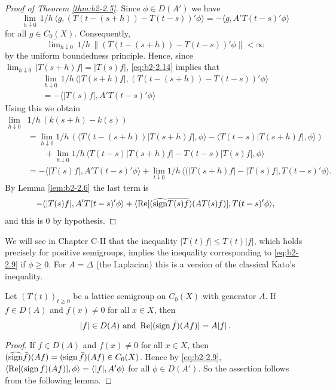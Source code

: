 \begin{proof}[Proof of Theorem \ref{thm:b2-2.5}]
Since $\phi \in D(A')$ we have
\begin{equation}\label{eq:b2-2.14}
\lim_{h \downarrow 0}\, 1/h\, \langle g,(T(t-(s+h)) - T(t-s))'\phi \rangle = - \langle g,A'T(t-s)'\phi \rangle
\end{equation}
for all $g \in C_{0}(X)$.
Consequently,
\begin{equation*}
\overline{\lim}_{h \downarrow 0}\, 1/h\, \|(T(t-(s+h)) - T(t-s))'\phi\| < \infty
\end{equation*}
by the uniform boundedness principle.
Hence, since $\lim_{h \downarrow 0}\, |T(s+h)f| = |T(s)f|$, \eqref{eq:b2-2.14} implies that
\begin{equation}\label{eq:b2-2.15}
\begin{split}
\lim_{h \downarrow 0}\, 1/h\, \langle |T(s+h)f|,(T(t-(s+h)) - T(t-s))'\phi \rangle \\
= - \langle |T(s)f|,A'T(t-s)'\phi \rangle
\end{split}
\end{equation}
Using this we obtain
\begin{align*}
\lim_{h \downarrow 0} &1/h\, (k(s+h) - k(s)) \\
&= \lim_{h \downarrow 0} 1/h\, (\langle T(t-(s+h))|T(s+h)f|,\phi \rangle - \langle T(t-s)|T(s+h)f|,\phi \rangle) \\
&\qquad + \lim_{h \downarrow 0} 1/h\, \langle T(t-s)|T(s+h)f| - T(t-s)|T(s)f|,\phi \rangle \\
&= -\langle |T(s)f|,A'T(t-s)'\phi \rangle + \lim_{t \downarrow 0} 1/h \, \langle (|T(s+h)f| -  |T(s)f| , T(t-s)'\phi \rangle .
\end{align*}
By Lemma \ref{lem:b2-2.6} the last term is
\begin{align*}
- \langle |T(s)f|,A'T(t-s)'\phi \rangle + \langle \mathop{}\!\mathrm{Re}[(\widehat{\operatorname{sign}} \overline{T(s)f})(AT(s)f)],T(t-s)'\phi \rangle,
\end{align*}
and this is $0$ by hypothesis.
\end{proof}
\begin{remark}\label{rem:b2-2.7}
We will see in Chapter C-II that the inequality $|T(t)f| \leq T(t)|f|$, which holds precisely for positive semigroups, implies the inequality corresponding to \eqref{eq:b2-2.9}
if $\phi \geq 0$.
For $A = \Delta$ (the Laplacian) this is a version of the classical Kato's inequality.
\end{remark}
\begin{corollary}\label{cor:b2-2.8}
Let $(T(t))_{t \geq 0}$ be a lattice semigroup on $C_{0}(X)$ with generator $A$.
If $f \in D(A)$ and $f(x) \neq 0$ for all $x \in X$, then 
\[
|f| \in D(A) \text{ and } \mathop{}\!\mathrm{Re}[(\operatorname{sign} \bar{f})(Af)] = A|f|\,.
\]
\end{corollary}
\begin{proof}
If $f \in D(A)$ and $f(x) \neq 0$ for all $x \in X$, then $(\widehat{\operatorname{sign}} \bar{f})(Af) = (\operatorname{sign} \bar{f})(Af) \in C_{0}(X)$.
Hence by \eqref{eq:b2-2.9}, $\langle \mathop{}\!\mathrm{Re}[(\operatorname{sign} \bar{f})(Af)],\phi \rangle = \langle |f|,A'\phi \rangle$ for all $\phi \in D(A')$.
So the assertion follows from the following lemma.
\end{proof}


